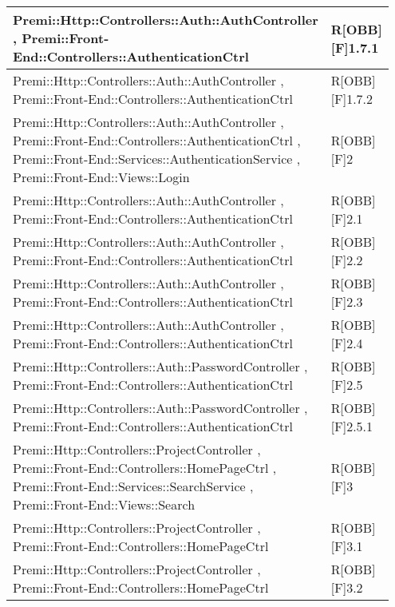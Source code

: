 \begin{table}[h]
\begin{center}
\begin{tabular}{|p{0.75\linewidth}|p{0.2\linewidth}|}
		\bottomrule
	\end{tabular}
\end{center}
\end{table}


\begin{table}[h]
	\begin{center}
		\begin{tabular}{|p{0.75\linewidth}|p{0.2\linewidth}|}
			\toprule
			Premi::Http::Controllers::Auth::AuthController , Premi::Front-End::Controllers::AuthenticationCtrl & R[OBB][F]1.7.1 \\
		\midrule
			Premi::Http::Controllers::Auth::AuthController , Premi::Front-End::Controllers::AuthenticationCtrl & R[OBB][F]1.7.2 \\
		\midrule
			Premi::Http::Controllers::Auth::AuthController , Premi::Front-End::Controllers::AuthenticationCtrl , Premi::Front-End::Services::AuthenticationService , Premi::Front-End::Views::Login & R[OBB][F]2 \\
		\midrule
			Premi::Http::Controllers::Auth::AuthController , Premi::Front-End::Controllers::AuthenticationCtrl & R[OBB][F]2.1 \\
		\midrule
			Premi::Http::Controllers::Auth::AuthController , Premi::Front-End::Controllers::AuthenticationCtrl & R[OBB][F]2.2 \\
		\midrule
			Premi::Http::Controllers::Auth::AuthController , Premi::Front-End::Controllers::AuthenticationCtrl & R[OBB][F]2.3 \\
		\midrule
			Premi::Http::Controllers::Auth::AuthController , Premi::Front-End::Controllers::AuthenticationCtrl & R[OBB][F]2.4 \\
		\midrule
			Premi::Http::Controllers::Auth::PasswordController , Premi::Front-End::Controllers::AuthenticationCtrl & R[OBB][F]2.5 \\
		\midrule
			Premi::Http::Controllers::Auth::PasswordController , Premi::Front-End::Controllers::AuthenticationCtrl & R[OBB][F]2.5.1 \\
		\midrule
			Premi::Http::Controllers::ProjectController , Premi::Front-End::Controllers::HomePageCtrl , Premi::Front-End::Services::SearchService , Premi::Front-End::Views::Search & R[OBB][F]3 \\
		\midrule
			Premi::Http::Controllers::ProjectController , Premi::Front-End::Controllers::HomePageCtrl & R[OBB][F]3.1 \\
		\midrule
			Premi::Http::Controllers::ProjectController , Premi::Front-End::Controllers::HomePageCtrl & R[OBB][F]3.2 \\

\end{tabular}
\end{center}
\end{table}
